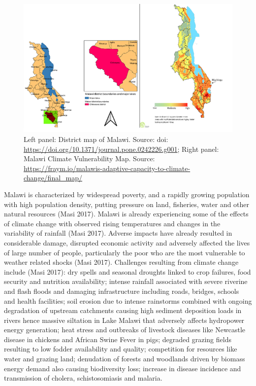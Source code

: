 \documentclass[
]{book}
\begin{document}
\begin{figure}
\centering
\includegraphics{images/admn2_map.png}
\caption{Left panel: District map of Malawi. Source: doi: \url{https://doi.org/10.1371/journal.pone.0242226.g001}; Right panel: Malawi Climate Vulnerability Map. Source: \url{https://fraym.io/malawis-adaptive-capacity-to-climate-change/final_map/}}
\end{figure}

Malawi is characterized by widespread poverty, and a rapidly growing population with high population density, putting pressure on land, fisheries, water and other natural resources (Masi 2017). Malawi is already experiencing some of the effects of climate change with observed rising temperatures and changes in the variability of rainfall (Masi 2017). Adverse impacts have already resulted in considerable damage, disrupted economic activity and adversely affected the lives of large number of people, particularly the poor who are the most vulnerable to weather related shocks (Masi 2017). Challenges resulting from climate change include (Masi 2017): dry spells and seasonal droughts linked to crop failures, food security and nutrition availability; intense rainfall associated with severe riverine and flash floods and damaging infrastructure including roads, bridges, schools and health facilities; soil erosion due to intense rainstorms combined with ongoing degradation of upstream catchments causing high sediment deposition loads in rivers hence massive siltation in Lake Malawi that adversely affects hydropower energy generation; heat stress and outbreaks of livestock diseases like Newcastle disease in chickens and African Swine Fever in pigs; degraded grazing fields resulting to low fodder availability and quality; competition for resources like water and grazing land; denudation of forests and woodlands driven by biomass energy demand also causing biodiversity loss; increase in disease incidence and transmission of cholera, schistosomiasis and malaria.
\end{document}
